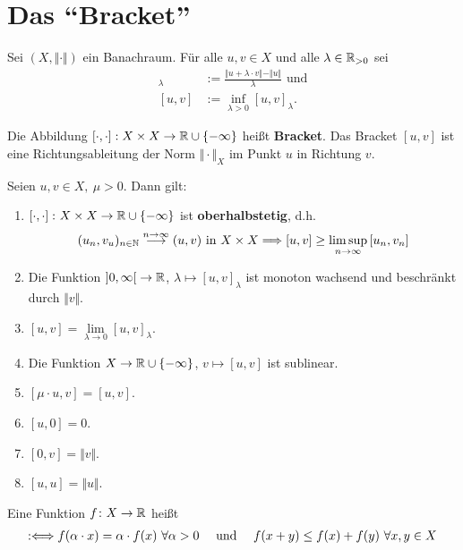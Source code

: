 \section{Das ``Bracket''}
\begin{definition}
	Sei $(X,\Vert\cdot\Vert)$ ein Banachraum. 
	Für alle $u,v\in X$ und alle $\lambda\in\mathbb{R}_{>0}$ sei
	\begin{align*}
		[u,v]_\lambda&:=\frac{\Vert u+\lambda\cdot v\Vert-\Vert u\Vert}{\lambda}\text{ und}\\
		[u,v]&:=\inf\limits_{\lambda>0}[u,v]_\lambda.
	\end{align*}

	Die Abbildung $[\cdot,\cdot]:X\times X\to\mathbb{R}\cup\lbrace-\infty\rbrace$ heißt \textbf{Bracket}. 
	Das Bracket $[u,v]$ ist eine Richtungsableitung der Norm $\Vert\cdot\Vert_X$ im Punkt $u$ in Richtung $v$.
\end{definition}

\begin{lemma}
	Seien $u,v\in X,~\mu>0$. 
	Dann gilt:
	\begin{enumerate}[label=(\roman*)]
		\item $\left[\cdot,\cdot\right]\colon X\times X\to\mathbb{R}\cup\lbrace-\infty\rbrace$ ist \textbf{oberhalbstetig}, d.h. 
		\begin{align*}
			(u_n,v_u)_{n\in\mathbb{N}}\overset{n\to\infty}{\longrightarrow}(u,v)\text{ in }X\times X\Longrightarrow\left[u,v\right]\geq\limsup_{n\to\infty}\left[u_n,v_n\right]
		\end{align*}

		\item Die Funktion $\left]0,\infty\right[\to\mathbb{R}$, $\lambda\mapsto\left[u,v\right]_\lambda$ ist monoton wachsend und beschränkt durch $\Vert v\Vert$.
		\item $\left[u,v\right]=\lim\limits_{\lambda\to0}\left[u,v\right]_\lambda$.
		\item Die Funktion $X\to\mathbb{R}\cup\lbrace-\infty\rbrace$, $v\mapsto\left[u,v\right]$ ist sublinear.
		\item $\left[\mu\cdot u,v\right]=\left[u,v\right]$.
		\item $\left[u,0\right]=0$.
		\item $\left[0,v\right]=\Vert v\Vert$.
		\item $\left[u,u\right]=\Vert u\Vert$.
	\end{enumerate}
\end{lemma}

\begin{erinnerung}
	Eine Funktion $f\colon X\to\mathbb{R}$ heißt 
	\begin{align*}
		:\Longleftrightarrow f(\alpha\cdot x)=\alpha\cdot f(x)~\forall\alpha>0
		\quad\text{ und }\quad
		f(x+y)\leq f(x)+f(y)~\forall x,y\in X
	\end{align*}
\end{erinnerung}

